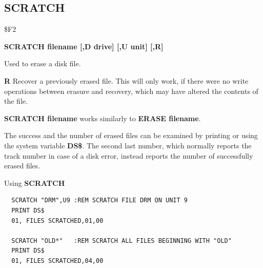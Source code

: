 \subsection{SCRATCH}
\begin{description}[leftmargin=2cm,style=nextline]
\item [Token:] \$F2
\item [Format:] {\bf SCRATCH filename [,D drive] [,U unit] [,R]}
\item [Usage:] Used to erase a disk file.

   \filenamedefinition

   \drivedefinition

   \unitdefinition

   {\bf R} Recover a previously erased file.
   This will only work, if there were no write operations
   between erasure and recovery, which may have altered the
   contents of the file.

\item [Remarks:] {\bf SCRATCH filename} works similarly to
                 {\bf ERASE filename}.

                 The success and the number of erased files can
                 be examined by printing or using the system
                 variable {\bf DS\$}. The second last number, which
                 normally reports the track number in case of a disk error,
                 instead reports the number of successfully erased files.

\item [Examples:] Using {\bf SCRATCH}
\begin{tcolorbox}[colback=black,coltext=white]
\verbatimfont{\codefont}
\begin{verbatim}
  SCRATCH "DRM",U9 :REM SCRATCH FILE DRM ON UNIT 9
  PRINT DS$
  01, FILES SCRATCHED,01,00

  SCRATCH "OLD*"   :REM SCRATCH ALL FILES BEGINNING WITH "OLD"
  PRINT DS$
  01, FILES SCRATCHED,04,00
\end{verbatim}
\end{tcolorbox}
\end{description}


\newpage
